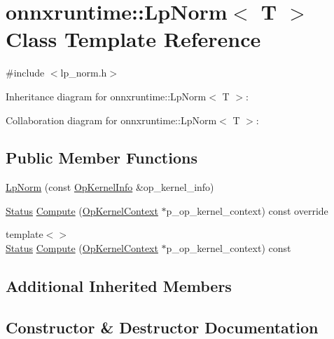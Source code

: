 \hypertarget{classonnxruntime_1_1LpNorm}{}\section{onnxruntime\+:\+:Lp\+Norm$<$ T $>$ Class Template Reference}
\label{classonnxruntime_1_1LpNorm}


{\ttfamily \#include $<$lp\+\_\+norm.\+h$>$}



Inheritance diagram for onnxruntime\+:\+:Lp\+Norm$<$ T $>$\+:


Collaboration diagram for onnxruntime\+:\+:Lp\+Norm$<$ T $>$\+:
\subsection*{Public Member Functions}
\begin{DoxyCompactItemize}
\item 
\mbox{\hyperlink{classonnxruntime_1_1LpNorm_ad949d7aef26ede9d88ac4b2753fe3bc6}{Lp\+Norm}} (const \mbox{\hyperlink{classonnxruntime_1_1OpKernelInfo}{Op\+Kernel\+Info}} \&op\+\_\+kernel\+\_\+info)
\item 
\mbox{\hyperlink{classonnxruntime_1_1common_1_1Status}{Status}} \mbox{\hyperlink{classonnxruntime_1_1LpNorm_ac33db79168eb2c942307cf85b60f3fe3}{Compute}} (\mbox{\hyperlink{classonnxruntime_1_1OpKernelContext}{Op\+Kernel\+Context}} $\ast$p\+\_\+op\+\_\+kernel\+\_\+context) const override
\item 
{\footnotesize template$<$$>$ }\\\mbox{\hyperlink{classonnxruntime_1_1common_1_1Status}{Status}} \mbox{\hyperlink{classonnxruntime_1_1LpNorm_a5c25a7bd7e5c64e9b60a178135a72115}{Compute}} (\mbox{\hyperlink{classonnxruntime_1_1OpKernelContext}{Op\+Kernel\+Context}} $\ast$p\+\_\+op\+\_\+kernel\+\_\+context) const
\end{DoxyCompactItemize}
\subsection*{Additional Inherited Members}


\subsection{Constructor \& Destructor Documentation}
\mbox{\label{classonnxruntime_1_1LpNorm_ad949d7aef26ede9d88ac4b2753fe3bc6}} 
